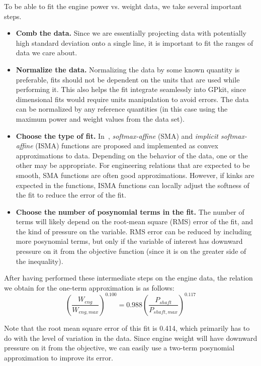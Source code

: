 To be able to fit the engine power vs. weight data, we take several important steps.
\begin{itemize}
    \item \textbf{Comb the data.} Since we are essentially projecting
    data with potentially high standard deviation onto a single line,
    it is important to fit the ranges of data we care about.
    \item \textbf{Normalize the data.} Normalizing the data
    by some known quantity is preferable, fits should not be dependent on the
    units that are used while performing it. This also helps the fit integrate
    seamlessly into GPkit, since dimensional fits would require units manipulation
    to avoid errors. The data can be normalized by any
    reference quantities (in this case using the maximum power and weight values
    from the data set).
    \item \textbf{Choose the type of fit.} In~\cite{gpfitpaper}, \textit{softmax-affine}
    (SMA) and \textit{implicit softmax-affine} (ISMA)
    functions are proposed and implemented as convex approximations
    to data. Depending on the behavior of the data, one or the other
    may be appropriate. For engineering relations that are expected to be smooth, SMA
    functions are often good approximations. However, if kinks are expected in the
    functions, ISMA functions can locally adjust the softness of the fit to
    reduce the error of the fit.
    \item \textbf{Choose the number of posynomial terms in the fit.} The number of
    terms will likely depend on the root-mean square (RMS) error of the fit, and
    the kind of pressure on the variable. RMS error can be reduced by including
    more posynomial terms, but only if the variable of interest has downward
    pressure on it from the objective function (since it is on the greater side
    of the inequality).
\end{itemize}

After having performed these intermediate steps on the engine data,
the relation we obtain for the one-term approximation is as follows:
\begin{equation}
    \left(\frac{W_{eng}}{W_{eng,max}}\right)^{0.100} = 0.988 \left(\frac{P_{shaft}}{P_{shaft,max}}\right)^{0.117}
\end{equation}

Note that the root mean square error of this fit is 0.414, which primarily has to do with
the level of variation in the data. Since engine weight will have downward pressure
on it from the objective, we can easily use a two-term posynomial approximation to
improve its error.

